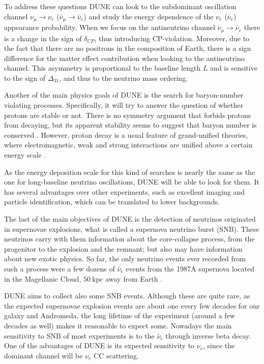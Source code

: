 To address these questions DUNE can look to the subdominant oscillation channel $\nu_{\mu} \rightarrow \nu_{e}$ ($\bar{\nu}_{\mu} \rightarrow \bar{\nu}_{e}$) and study the energy dependence of the $\nu_{e}$ ($\bar{\nu}_{e}$) appearance probability. When we focus on the antineutrino channel $\bar{\nu}_{\mu} \rightarrow \bar{\nu}_{e}$ there is a change in the sign of $\delta_{CP}$, thus introducing CP-violation. Moreover, due to the fact that there are no positrons in the composition of Earth, there is a sign difference for the matter effect contribution when looking to the antineutrino channel. This asymmetry is proportional to the baseline length $L$ and is sensitive to the sign of $\Delta_{31}$, and thus to the neutrino mass ordering.

Another of the main physics goals of DUNE is the search for baryon-number violating processes. Specifically, it will try to answer the question of whether protons are stable or not. There is no symmetry argument that forbids protons from decaying, but its apparent stability seems to suggest that baryon number is conserved \cite{Super-Kamiokande2009}. However, proton decay is a usual feature of grand-unified theories, where electromagnetic, weak and strong interactions are unified above a certain energy scale \cite{Raby2006}.

As the energy deposition scale for this kind of searches is nearly the same as the one for long-baseline neutrino oscillations, DUNE will be able to look for them. It has several advantages over other experiments, such as excellent imaging and particle identification, which can be translated to lower backgrounds.

The last of the main objectives of DUNE is the detection of neutrinos originated in supernovae explosions, what is called a supernova neutrino burst (SNB). These neutrinos carry with them information about the core-collapse process, from the progenitor to the explosion and the remnant; but also may have information about new exotic physics. So far, the only neutrino events ever recorded from such a process were a few dozens of $\bar{\nu}_{e}$ events from the 1987A supernova located in the Magellanic Cloud, $50~\mathrm{kpc}$ away from Earth \cite{Kamiokande-II1987, Bionta1987}.

DUNE aims to collect also some SNB events. Although these are quite rare, as the expected supernovae explosion events are about one every few decades for our galaxy and Andromeda, the long lifetime of the experiment (around a few decades as well) makes it reasonable to expect some. Nowadays the main sensitivity to SNB of most experiments is to the $\bar{\nu}_{e}$ through inverse beta decay. One of the advantages of DUNE is its expected sensitivity to $\nu_{e}$, since the dominant channel will be $\nu_{e}$ CC scattering.

